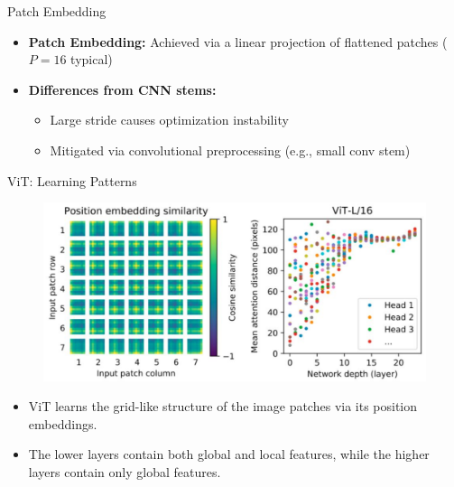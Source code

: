 \begin{frame}{Patch Embedding}
    \begin{itemize}
        \item \textbf{Patch Embedding:} Achieved via a linear projection of flattened patches (\(P=16\) typical)
        \item \textbf{Differences from CNN stems:}
        \begin{itemize}
            \item Large stride causes optimization instability
            \item Mitigated via convolutional preprocessing (e.g., small conv stem)
        \end{itemize}
    \end{itemize}
\end{frame}

\begin{frame}{ViT: Learning Patterns}
    \begin{figure}
        \centering
        \includegraphics[width=0.85\linewidth,height=\textheight,keepaspectratio]{images/vit/learning_patterns.png}
    \end{figure}
    \begin{itemize}
        \item ViT learns the grid-like structure of the image patches via its position embeddings.
        \item The lower layers contain both global and local features, while the higher layers contain only global features.
    \end{itemize}
\end{frame}